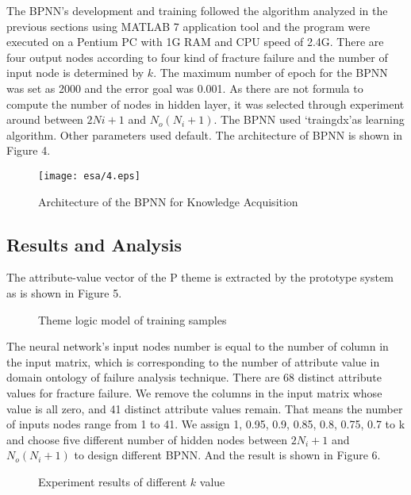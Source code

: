 \documentclass{elsarticle}
\begin{document}
The BPNN’s development and training followed the algorithm analyzed in
the previous sections using MATLAB 7 application tool and the program
were executed on a Pentium PC with 1G RAM and CPU speed of 2.4G. There
are four output nodes according to four kind of fracture failure and
the number of input node is determined by $k$. The maximum number of
epoch for the BPNN was set as 2000 and the error goal was 0.001. As
there are not formula to compute the number of nodes in hidden layer,
it was selected through experiment around between $2Ni+1$ and $N_o(N_i
+1)$. The BPNN used ‘traingdx’as learning algorithm. Other parameters
used default. The architecture of BPNN is shown in Figure 4.
\begin{figure}[htb]
  \centering
  \texttt{[image: esa/4.eps]}
  \caption{Architecture of the BPNN for Knowledge Acquisition
  }
\label{fig:4}
\end{figure}

\subsection{Results and Analysis
}
\label{sec:results-analysis-}

The attribute-value vector of the P theme is extracted by the prototype system as is shown in Figure 5.

 \begin{figure}[htb]
  \centering
  \caption{Theme logic model of training samples}
\label{fig:5}
\end{figure}

The neural network’s input nodes number is equal to the number of column in the input matrix, which is corresponding to the number of attribute value in domain ontology of failure analysis technique. There are 68 distinct attribute values for fracture failure. We remove the columns in the input matrix whose value is all zero, and 41 distinct attribute values remain. That means the number of inputs nodes range from 1 to 41. We assign 1, 0.95, 0.9, 0.85, 0.8, 0.75, 0.7 to k and choose five different number of hidden nodes between $2N_i+1$ and $N_o(N_i +1)$ to design different BPNN. And the result is shown in Figure 6.

 \begin{figure}[htb]
  \centering
  \caption{Experiment results of different $k$ value}
\label{fig:6}
\end{figure}
 
\end{document}
